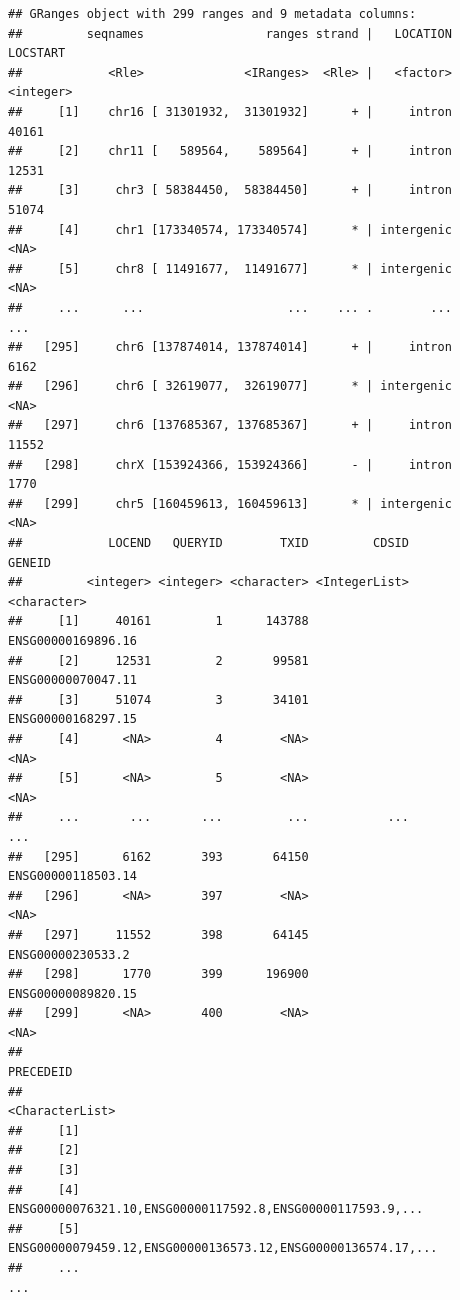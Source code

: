 \documentclass[9pt,a4paper,]{extarticle}
\begin{document}
\begin{verbatim}
## GRanges object with 299 ranges and 9 metadata columns:
##         seqnames                 ranges strand |   LOCATION  LOCSTART
##            <Rle>              <IRanges>  <Rle> |   <factor> <integer>
##     [1]    chr16 [ 31301932,  31301932]      + |     intron     40161
##     [2]    chr11 [   589564,    589564]      + |     intron     12531
##     [3]     chr3 [ 58384450,  58384450]      + |     intron     51074
##     [4]     chr1 [173340574, 173340574]      * | intergenic      <NA>
##     [5]     chr8 [ 11491677,  11491677]      * | intergenic      <NA>
##     ...      ...                    ...    ... .        ...       ...
##   [295]     chr6 [137874014, 137874014]      + |     intron      6162
##   [296]     chr6 [ 32619077,  32619077]      * | intergenic      <NA>
##   [297]     chr6 [137685367, 137685367]      + |     intron     11552
##   [298]     chrX [153924366, 153924366]      - |     intron      1770
##   [299]     chr5 [160459613, 160459613]      * | intergenic      <NA>
##            LOCEND   QUERYID        TXID         CDSID             GENEID
##         <integer> <integer> <character> <IntegerList>        <character>
##     [1]     40161         1      143788               ENSG00000169896.16
##     [2]     12531         2       99581               ENSG00000070047.11
##     [3]     51074         3       34101               ENSG00000168297.15
##     [4]      <NA>         4        <NA>                             <NA>
##     [5]      <NA>         5        <NA>                             <NA>
##     ...       ...       ...         ...           ...                ...
##   [295]      6162       393       64150               ENSG00000118503.14
##   [296]      <NA>       397        <NA>                             <NA>
##   [297]     11552       398       64145                ENSG00000230533.2
##   [298]      1770       399      196900               ENSG00000089820.15
##   [299]      <NA>       400        <NA>                             <NA>
##                                                            PRECEDEID
##                                                      <CharacterList>
##     [1]                                                             
##     [2]                                                             
##     [3]                                                             
##     [4]   ENSG00000076321.10,ENSG00000117592.8,ENSG00000117593.9,...
##     [5] ENSG00000079459.12,ENSG00000136573.12,ENSG00000136574.17,...
##     ...                                                          ...

\end{verbatim}
\end{document}
